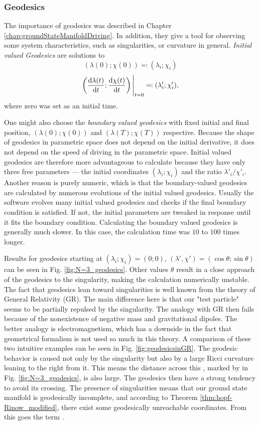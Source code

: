 \newpage
\subsubsection{Geodesics}
The importance of geodesics was described in Chapter \ref{chap:groundStateManifoldDriving}. In addition, they give a tool for observing some system characteristics, such as singularities, or curvature in general. \emph{Initial valued Geodesics} are solutions to
$$(\lambda(0);\chi(0))\eqqcolon (\lambda_i;\chi_i)$$
$$\left(\frac{\mathrm{d} \lambda(t)}{\mathrm{d} t};\frac{\mathrm{d} \chi(t)}{\mathrm{d} t}\right)\Bigg|_{t=0} \eqqcolon (\lambda'_i;\chi'_i),$$
where zero was set as an initial time.

One might also choose the \emph{boundary valued geodesics} with fixed initial and final position, $(\lambda(0);\chi(0))$ and $(\lambda(T);\chi(T))$ respective. Because the shape of geodesics in parametric space does not depend on the initial derivative, it does not depend on the speed of driving in the parametric space. Initial valued geodesics are therefore more advantageous to calculate because they have only three free parameters — the initial coordinates $(\lambda_i;\chi_i)$ and the ratio $\lambda'_i/\chi'_i$. Another reason is purely numeric, which is that the boundary-valued geodesics are calculated by numerous evolutions of the initial valued geodesics. Usually the software evolves many initial valued geodesics and checks if the final boundary condition is satisfied. If not, the initial parameters are tweaked in response until it fits the boundary condition. Calculating the boundary valued geodesics is generally much slower. In this case, the calculation time was $10$ to $100$ times longer.

Results for geodesics starting at $(\lambda_i;\chi_i)=(0;0)$, $
(\lambda',\chi')=(\cos\theta;\sin\theta)$ can be seen in Fig. \ref{fig:N=3_geodesics}. Other values $\theta$ result in a close approach of the geodesics to the singularity, making the calculation numerically unstable. The fact that geodesics lean toward singularities is well known from the theory of General Relativity (GR). The main difference here is that our "test particle" seems to be partially repulsed by the singularity. The analogy with GR then fails because of the nonexistence of negative mass and gravitational dipoles. The better analogy is electromagnetism, which has a downside in the fact that geometrical formalism is not used so much in this theory. A comparison of these two intuitive examples can be seen in Fig. \ref{fig:geodesicsinGR}. The geodesic behavior is caused not only by the singularity but also by a large Ricci curvature leaning to the right from it. This means the distance across this \emph{}, marked by  in Fig. \ref{fig:N=3_geodesics}, is also large. The geodesics then have a strong tendency to avoid its crossing. The presence of singularities means that our ground state manifold is geodesically incomplete, and according to Theorem \ref{thm:hopf-Rinow_modified}, there exist some geodesically unreachable coordinates. From this goes the term \emph{}.

